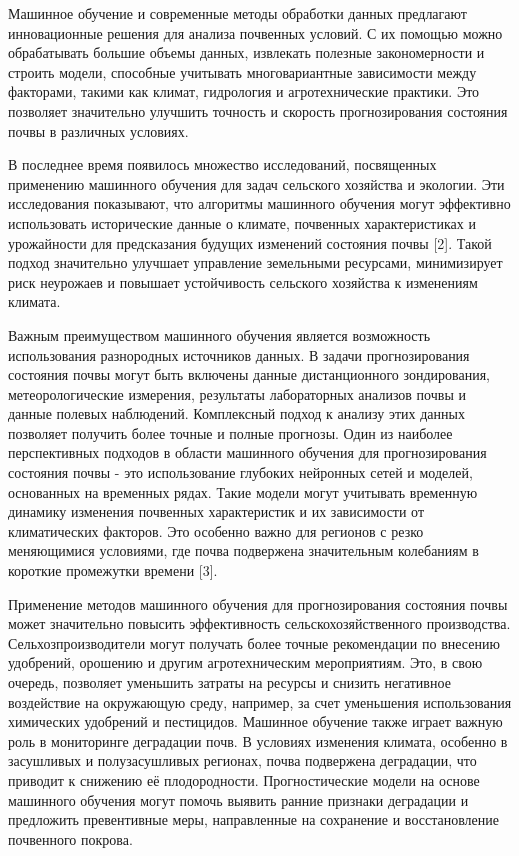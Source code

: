 Машинное обучение и современные методы обработки данных предлагают
инновационные решения для анализа почвенных условий. С их помощью можно
обрабатывать большие объемы данных, извлекать полезные закономерности и
строить модели, способные учитывать многовариантные зависимости между
факторами, такими как климат, гидрология и агротехнические практики. Это
позволяет значительно улучшить точность и скорость прогнозирования
состояния почвы в различных условиях.

В последнее время появилось множество исследований, посвященных
применению машинного обучения для задач сельского хозяйства и экологии.
Эти исследования показывают, что алгоритмы машинного обучения могут
эффективно использовать исторические данные о климате, почвенных
характеристиках и урожайности для предсказания будущих изменений
состояния почвы {[}2{]}. Такой подход значительно улучшает управление
земельными ресурсами, минимизирует риск неурожаев и повышает
устойчивость сельского хозяйства к изменениям климата.

Важным преимуществом машинного обучения является возможность
использования разнородных источников данных. В задачи прогнозирования
состояния почвы могут быть включены данные дистанционного зондирования,
метеорологические измерения, результаты лабораторных анализов почвы и
данные полевых наблюдений. Комплексный подход к анализу этих данных
позволяет получить более точные и полные прогнозы. Один из наиболее
перспективных подходов в области машинного обучения для прогнозирования
состояния почвы - это использование глубоких нейронных сетей и моделей,
основанных на временных рядах. Такие модели могут учитывать временную
динамику изменения почвенных характеристик и их зависимости от
климатических факторов. Это особенно важно для регионов с резко
меняющимися условиями, где почва подвержена значительным колебаниям в
короткие промежутки времени {[}3{]}.

Применение методов машинного обучения для прогнозирования состояния
почвы может значительно повысить эффективность сельскохозяйственного
производства. Сельхозпроизводители могут получать более точные
рекомендации по внесению удобрений, орошению и другим агротехническим
мероприятиям. Это, в свою очередь, позволяет уменьшить затраты на
ресурсы и снизить негативное воздействие на окружающую среду, например,
за счет уменьшения использования химических удобрений и пестицидов.
Машинное обучение также играет важную роль в мониторинге деградации
почв. В условиях изменения климата, особенно в засушливых и
полузасушливых регионах, почва подвержена деградации, что приводит к
снижению её плодородности. Прогностические модели на основе машинного
обучения могут помочь выявить ранние признаки деградации и предложить
превентивные меры, направленные на сохранение и восстановление
почвенного покрова.

